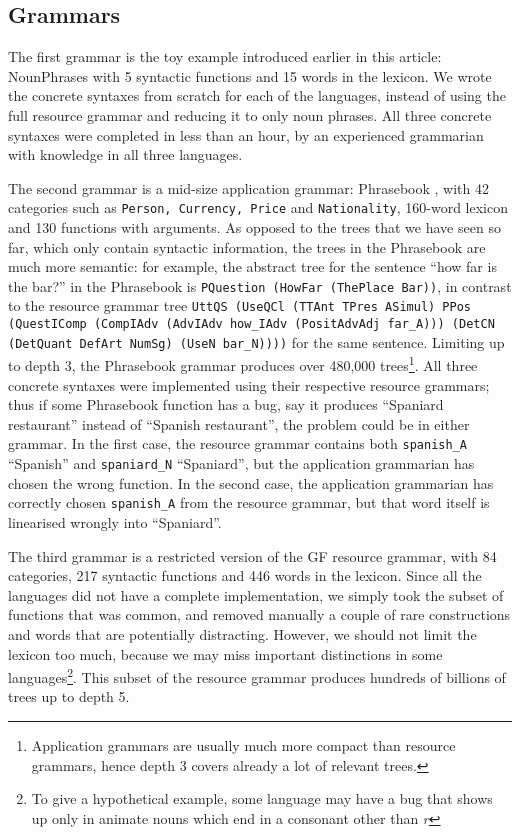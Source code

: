 \documentclass[11pt]{article}
\def\t#1{\texttt{#1}}
\begin{document}
\subsection{Grammars}

The first grammar is the toy example introduced earlier in this
article: NounPhrases with 5 syntactic functions and 15 words in the
lexicon. We wrote the concrete syntaxes from scratch for each of the
languages, instead of using the full resource grammar and reducing it
to only noun phrases. All three concrete syntaxes were completed
in less than an hour, by an experienced grammarian with knowledge in
all three languages.

The second grammar is a mid-size application grammar: Phrasebook
\cite{ranta2010phrasebook}, with 42 categories such as \t{Person,
  Currency, Price} and \t{Nationality}, 160-word lexicon and 130
functions with arguments. As opposed to the trees that we have seen so far,
which only contain syntactic information, the trees in the Phrasebook
are much more semantic: for example, the abstract tree for the
sentence ``how far is the bar?'' in the Phrasebook is \t{PQuestion
  (HowFar (ThePlace Bar))}, in contrast to the resource grammar tree
{\tt \small UttQS (UseQCl (TTAnt TPres ASimul) PPos (QuestIComp
  (CompIAdv (AdvIAdv how\_IAdv (PositAdvAdj far\_A))) 
  (DetCN (DetQuant DefArt NumSg) (UseN bar\_N))))} for the same
sentence. Limiting up to depth 3, the Phrasebook grammar produces over
480,000 trees\footnote{Application grammars are usually
much more compact than resource grammars, hence depth 3 covers already
a lot of relevant trees.}. All three concrete syntaxes were
implemented using their respective resource grammars; thus if some
Phrasebook function has a bug, say it produces ``Spaniard restaurant''
instead of ``Spanish restaurant'', the problem could be in either grammar.
In the first case, the resource grammar contains both \t{spanish\_A} ``Spanish'' and
\t{spaniard\_N} ``Spaniard'', but the application grammarian has
chosen the wrong function.
In the second case, the application grammarian has correctly chosen
\t{spanish\_A} from the resource grammar, but that word itself is
linearised wrongly into ``Spaniard''.



The third grammar is a restricted version of the GF resource grammar,
with 84 categories, 217 syntactic functions and 446 words in the
lexicon. Since all the languages did not have a complete
implementation, we simply took the subset of functions that was
common, and removed manually a couple of rare constructions and words
that are potentially distracting. However, we should not limit the
lexicon too much, because we may miss important distinctions 
in some languages\footnote{To give a hypothetical example, some language may
have a bug that shows up only in animate nouns which end in a
consonant other than \emph{r}}. This subset of the resource grammar
produces hundreds of billions of trees up to depth 5.
\end{document}
